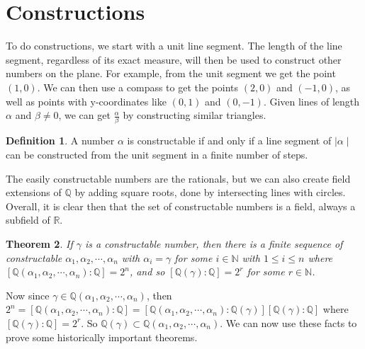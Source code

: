 \documentclass[11pt]{amsart}
\newtheorem{theorem}{Theorem}[section]
\theoremstyle{definition}
\newtheorem{definition}[theorem]{Definition}
\newcommand{\reals}{\mathbb{R}}
\newcommand{\rationals}{\mathbb{Q}}
\newcommand{\naturals}{\mathbb{N}}
\begin{document}
\newpage
\section{Constructions}
To do constructions, we start with a unit line segment. The length of the line segment, regardless of its exact measure, will then be used to 
construct other numbers on the plane. For example, from the unit segment we get the point $(1,0)$. We can then use a compass to get the
points $(2, 0)$ and $(-1, 0)$, as well as points with y-coordinates like $(0, 1)$ and $(0, -1)$. Given lines of length $\alpha$ and $\beta \neq 0$,
we can get $\frac{\alpha}{\beta}$ by constructing similar triangles.
\begin{definition}
	A number $\alpha$ is constructable if and only if a line segment of $\mid \alpha \mid$ can be constructed from the unit segment in a
	finite number of steps.
\end{definition}
The easily constructable numbers are the rationals, but we can also create field extensions of $\rationals$ by adding square roots, done
by intersecting lines with circles. Overall, it is clear then that the set of constructable numbers is a field, always a subfield of $\reals$. 
\begin{theorem}
	If $\gamma$ is a constructable number, then there is a finite sequence of constructable $\alpha_1, \alpha_2, \cdots, \alpha_n$ with
	$\alpha_i = \gamma$ for some $i \in \naturals$ with $1 \leq i \leq n$ where 
	$[ \rationals(\alpha_1, \alpha_2, \cdots, \alpha_n) : \rationals ] = 2^n$, and so $[ \rationals(\gamma) : \rationals] = 2^r$ for some 
	$r \in \naturals$.
\end{theorem}
Now since $\gamma \in \rationals(\alpha_1, \alpha_2, \cdots, \alpha_n)$, then $2^n = [ \rationals(\alpha_1, \alpha_2, \cdots, \alpha_n)
 : \rationals ] = [ \rationals(\alpha_1, \alpha_2, \cdots, \alpha_n) : \rationals(\gamma) ] [ \rationals(\gamma) : \rationals]$ where 
 $[ \rationals(\gamma) : \rationals ] = 2^r$. So $\rationals(\gamma) \subset \rationals(\alpha_1, \alpha_2, \cdots, \alpha_n)$. We can now use
 these facts to prove some historically important theorems.
 
\end{document}
